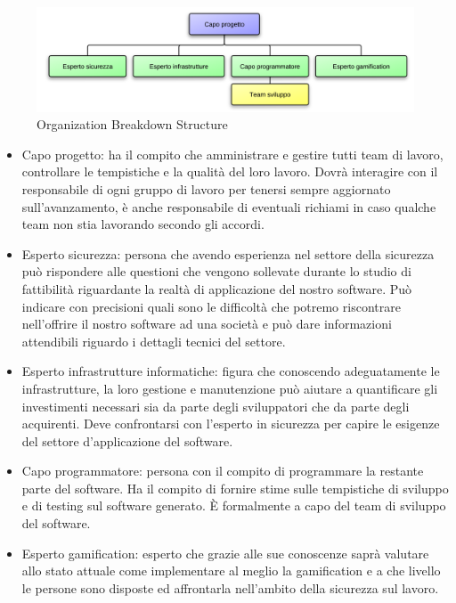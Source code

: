 \vspace*{0.5cm}

\begin{figure}[H]
\centering
\includegraphics[scale=0.7]{images/obs.png}
\caption{Organization Breakdown Structure}
\end{figure}

\vspace*{0.5cm}

\begin{itemize}
\item Capo progetto: ha il compito che amministrare e gestire tutti team di lavoro, controllare le tempistiche e la qualità del loro lavoro. Dovrà interagire con il responsabile di ogni gruppo di lavoro per tenersi sempre aggiornato sull'avanzamento, è anche responsabile di eventuali richiami in caso qualche team non stia lavorando secondo gli accordi.
\item Esperto sicurezza: persona che avendo esperienza nel settore della sicurezza può rispondere alle questioni che vengono sollevate durante lo studio di fattibilità riguardante la realtà di applicazione del nostro software. Può indicare con precisioni quali sono le difficoltà che potremo riscontrare nell'offrire il nostro software ad una società e può dare informazioni attendibili riguardo i dettagli tecnici del settore. 
\item Esperto infrastrutture informatiche: figura che conoscendo adeguatamente le infrastrutture, la loro gestione e manutenzione può aiutare a quantificare gli investimenti necessari sia da parte degli sviluppatori che da parte degli acquirenti. Deve confrontarsi con l'esperto in sicurezza per capire le esigenze del settore d'applicazione del software.
\item Capo programmatore: persona con il compito di programmare la restante parte del software. Ha il compito di fornire stime sulle tempistiche di sviluppo e di testing sul software generato. È formalmente a capo del team di sviluppo del software.
\item Esperto gamification: esperto che grazie alle sue conoscenze saprà valutare allo stato attuale come implementare al meglio la gamification e a che livello le persone sono disposte ed affrontarla nell'ambito della sicurezza sul lavoro.
\end{itemize}

